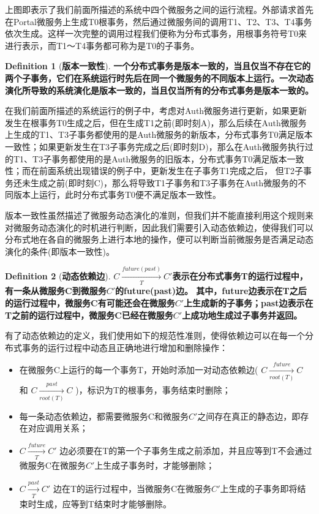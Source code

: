 \documentclass[a4paper]{article}
\theoremstyle{definition}
\newtheorem{definition}{Definition}[section]
\begin{document}
上图即表示了我们前面所描述的系统中四个微服务之间的运行流程。外部请求首先在Portal微服务上生成T0根事务，然后通过微服务间的调用T1、T2、T3、T4事务依次生成。这样一次完整的调用过程我们便称为分布式事务，用根事务符号T0来进行表示，而T1～T4事务都可称为是T0的子事务。

\begin{definition}[\textbf{版本一致性}]
\label{definition:version_consistency}
\textbf{一个分布式事务是版本一致的，当且仅当不存在它的两个子事务，它们在系统运行时先后在同一个微服务的不同版本上运行。一次动态演化所导致的系统演化是版本一致的，当且仅当所有的分布式事务是版本一致的。}
\end{definition}



在我们前面所描述的系统运行的例子中，考虑对Auth微服务进行更新，如果更新发生在根事务T0生成之后，但在生成T1之前(即时刻A)，那么后续在Auth微服务上生成的T1、T3子事务都使用的是Auth微服务的新版本，分布式事务T0满足版本一致性；如果更新发生在T3子事务完成之后(即时刻D)，那么在Auth微服务执行过的T1、T3子事务都使用的是Auth微服务的旧版本，分布式事务T0满足版本一致性；而在前面系统出现错误的例子中，更新发生在子事务T1完成之后， 但T2子事务还未生成之前(即时刻C)，那么将导致T1子事务和T3子事务在Auth微服务的不同版本上运行，此时分布式事务T0便不满足版本一致性。

版本一致性虽然描述了微服务动态演化的准则，但我们并不能直接利用这个规则来对微服务动态演化的时机进行判断，因此我们需要引入动态依赖边，使得我们可以分布式地在各自的微服务上进行本地的操作，便可以判断当前微服务是否满足动态演化的条件(即版本一致性)。

\begin{definition}[\textbf{动态依赖边}]
\label{definition:dynamic_dependences}
\textbf{$C \xrightarrow[T]{future(past)}  C'$表示在分布式事务T的运行过程中，有一条从微服务C到微服务$C'$的future(past)边。
其中，future边表示在T之后的运行过程中，微服务C有可能还会在微服务$C'$上生成新的子事务；past边表示在T之前的运行过程中，微服务C已经在微服务$C'$上成功地生成过子事务并返回。}
\end{definition}



有了动态依赖边的定义，我们使用如下的规范性准则，使得依赖边可以在每一个分布式事务的运行过程中动态且正确地进行增加和删除操作：

\begin{itemize}
\item{在微服务C上运行的每一个事务T，开始时添加一对动态依赖边( $C \xrightarrow[root(T)]{future}C$ 和 $C \xrightarrow[root(T)]{past}C$ )，标识为T的根事务，事务结束时删除；}


\item{每一条动态依赖边，都需要微服务C和微服务$C'$之间存在真正的静态边，即存在对应调用关系；}


\item{$C \xrightarrow[T]{future}C'$ 边必须要在T的第一个子事务生成之前添加，并且应等到T不会通过微服务C在微服务$C'$上生成子事务时，才能够删除；}


\item{$C \xrightarrow[T]{past}C'$ 边在T的运行过程中，当微服务C在微服务$C'$上生成的子事务即将结束时生成，应等到T结束时才能够删除。}
\end{itemize}
\end{document}
